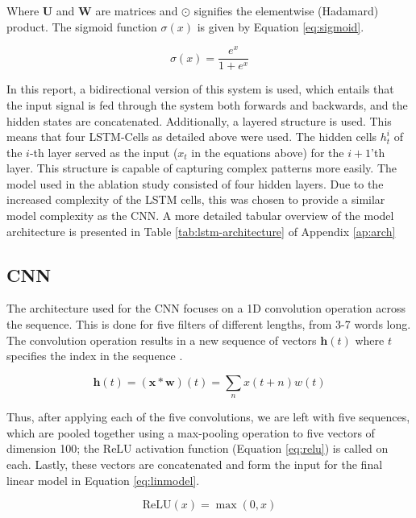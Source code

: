 \documentclass[12pt,a4paper,english]{article}
\begin{document}
Where $\boldsymbol{U}$ and $\boldsymbol{W}$ are matrices and $\odot$ signifies the elementwise (Hadamard) product. The sigmoid function $\sigma(x)$ is given by Equation \eqref{eq:sigmoid}.

\begin{equation}
    \sigma(x) = \dfrac{e^x}{1+e^x}
    \label{eq:sigmoid}
\end{equation}

In this report, a bidirectional version of this system is used, which entails that the input signal is fed through the system both forwards and backwards, and the hidden states are concatenated. Additionally, a layered structure is used. This means that four LSTM-Cells as detailed above were used. The hidden cells $h_{t}^i$ of the $i$-th layer served as the input ($x_t$ in the equations above) for the  $i+1$'th layer. This structure is capable of capturing complex patterns more easily. The model used in the ablation study consisted of four hidden layers. Due to the increased complexity of the LSTM cells, this was chosen to provide a similar model complexity as the CNN. A more detailed tabular overview of the model architecture is presented in Table \ref{tab:lstm-architecture} of Appendix \ref{ap:arch}


\subsection{CNN}
The architecture used for the CNN focuses on a 1D convolution operation across the sequence. This is done for five filters of different lengths, from 3-7 words long. The convolution operation results in a new sequence of vectors $\boldsymbol{h}(t)$ where $t$ specifies the index in the sequence \cite{Goodfellow-et-al-2016}.

\begin{equation}
    \boldsymbol{h}(t) = (\boldsymbol{x} * \boldsymbol{w})(t) = \sum_n x(t+n)w(t)
\end{equation}

Thus, after applying each of the five convolutions, we are left with five sequences, which are pooled together using a max-pooling operation to five vectors of dimension 100; the ReLU activation function (Equation \eqref{eq:relu}) is called on each. Lastly, these vectors are concatenated and form the input for the final linear model in Equation \eqref{eq:linmodel}.

\begin{equation}
    \text{ReLU} (x) = \max(0,x)
    \label{eq:relu}
\end{equation}
\end{document}
